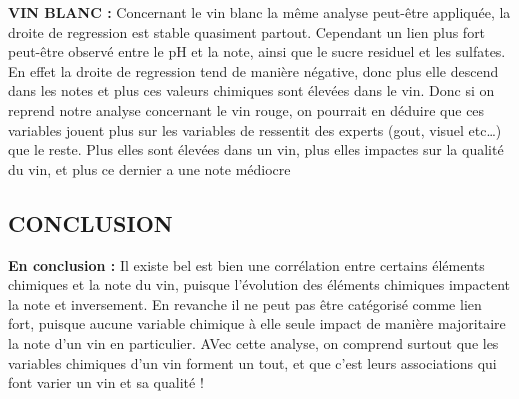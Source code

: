 \documentclass[
]{article}
\begin{document}
\textbf{VIN BLANC :} Concernant le vin blanc la même analyse peut-être
appliquée, la droite de regression est stable quasiment partout.
Cependant un lien plus fort peut-être observé entre le pH et la note,
ainsi que le sucre residuel et les sulfates. En effet la droite de
regression tend de manière négative, donc plus elle descend dans les
notes et plus ces valeurs chimiques sont élevées dans le vin. Donc si on
reprend notre analyse concernant le vin rouge, on pourrait en déduire
que ces variables jouent plus sur les variables de ressentit des experts
(gout, visuel etc\ldots) que le reste. Plus elles sont élevées dans un
vin, plus elles impactes sur la qualité du vin, et plus ce dernier a une
note médiocre

\subsection{\texorpdfstring{\textbf{CONCLUSION}}{CONCLUSION}}\label{conclusion}

\textbf{En conclusion : } Il existe bel est bien une corrélation entre
certains éléments chimiques et la note du vin, puisque l'évolution des
éléments chimiques impactent la note et inversement. En revanche il ne
peut pas être catégorisé comme lien fort, puisque aucune variable
chimique à elle seule impact de manière majoritaire la note d'un vin en
particulier. AVec cette analyse, on comprend surtout que les variables
chimiques d'un vin forment un tout, et que c'est leurs associations qui
font varier un vin et sa qualité !
\end{document}
